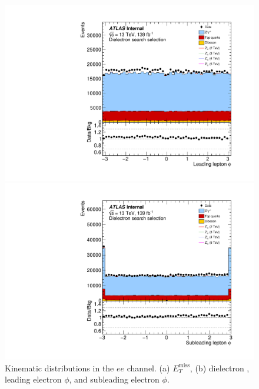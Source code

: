 {\begin{figure}[h!]
\begin{minipage}[b]{.45\linewidth}
    \includegraphics[width=1\textwidth]{figures/ci/dataMc/stacks_mc16e_2015-2018_ee_phi1.pdf}
    \subcaption{}
\end{minipage}
\begin{minipage}[b]{.45\linewidth}
    \includegraphics[width=1\textwidth]{figures/ci/dataMc/stacks_mc16e_2015-2018_ee_phi2.pdf}
    \subcaption{}
\end{minipage}
\caption{Kinematic distributions in the $ee$ channel. (a) $E_T^\text{miss}$, (b) dielectron \pt, leading electron $\phi$, and subleading electron $\phi$.}
\label{fig:}
\end{figure}
\clearpage
}

